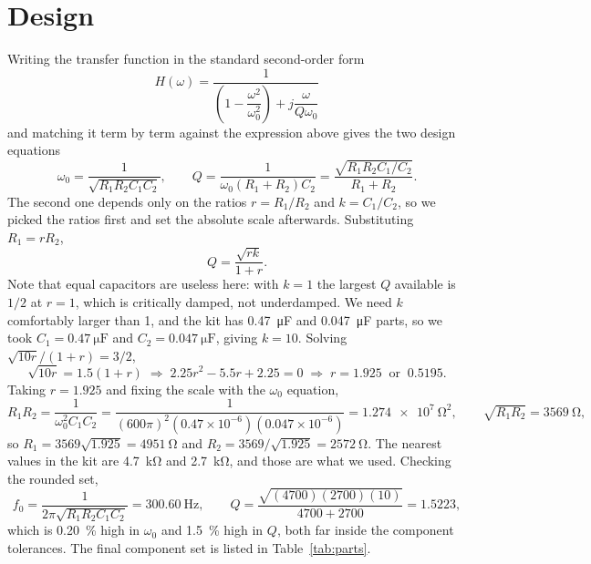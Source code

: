 \documentclass[11pt]{article}
\begin{document}
\section*{Design}
Writing the transfer function in the standard second-order form
\[
    H(\omega) = \frac{1}{\left(1-\dfrac{\omega^{2}}{\omega_0^{2}}\right)
    + j\dfrac{\omega}{Q\omega_0}}
\]
and matching it term by term against the expression above gives the two design
equations
\[
    \omega_0 = \frac{1}{\sqrt{R_1R_2C_1C_2}},
    \qquad
    Q = \frac{1}{\omega_0 (R_1+R_2)C_2}
      = \frac{\sqrt{R_1R_2C_1/C_2}}{R_1+R_2}.
\]
The second one depends only on the ratios $r = R_1/R_2$ and $k = C_1/C_2$, so we
picked the ratios first and set the absolute scale afterwards. Substituting
$R_1 = rR_2$,
\[
    Q = \frac{\sqrt{rk}}{1+r}.
\]
Note that equal capacitors are useless here: with $k=1$ the largest $Q$ available
is $1/2$ at $r=1$, which is critically damped, not underdamped. We need
$k$ comfortably larger than 1, and the kit has \qty{0.47}{\micro\farad} and
\qty{0.047}{\micro\farad} parts, so we took $C_1 = \qty{0.47}{\micro\farad}$ and
$C_2 = \qty{0.047}{\micro\farad}$, giving $k=10$. Solving $\sqrt{10r}/(1+r) = 3/2$,
\[
    \sqrt{10r} = 1.5(1+r)
    \;\Longrightarrow\;
    2.25r^{2} - 5.5r + 2.25 = 0
    \;\Longrightarrow\;
    r = 1.925 \ \text{ or } \ 0.5195 .
\]
Taking $r = 1.925$ and fixing the scale with the $\omega_0$ equation,
\[
    R_1R_2 = \frac{1}{\omega_0^{2}C_1C_2}
    = \frac{1}{(600\pi)^{2}(0.47\times10^{-6})(0.047\times10^{-6})}
    = \qty{1.274e7}{\ohm\squared},
    \qquad \sqrt{R_1R_2} = \qty{3569}{\ohm},
\]
so $R_1 = 3569\sqrt{1.925} = \qty{4951}{\ohm}$ and
$R_2 = 3569/\sqrt{1.925} = \qty{2572}{\ohm}$. The nearest values in the kit are
\qty{4.7}{\kilo\ohm} and \qty{2.7}{\kilo\ohm}, and those are what we used.
Checking the rounded set,
\[
    f_0 = \frac{1}{2\pi\sqrt{R_1R_2C_1C_2}} = \qty{300.60}{\hertz},
    \qquad
    Q = \frac{\sqrt{(4700)(2700)(10)}}{4700+2700} = 1.5223,
\]
which is \qty{0.20}{\percent} high in $\omega_0$ and \qty{1.5}{\percent} high in
$Q$, both far inside the component tolerances. The final component set is listed
in Table~\ref{tab:parts}.
\end{document}
